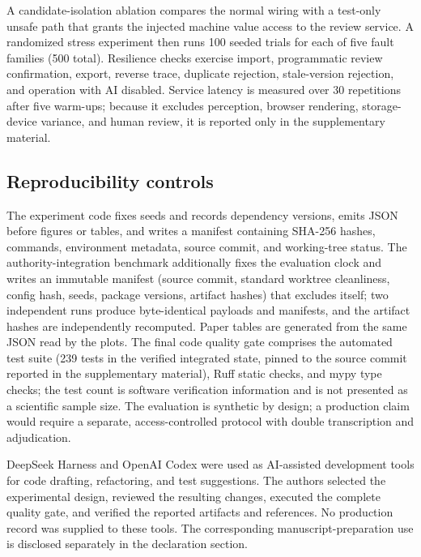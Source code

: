 A candidate-isolation ablation compares the normal wiring with a test-only unsafe path that grants the injected machine value access to the review service. A randomized stress experiment then runs 100 seeded trials for each of five fault families (500 total). Resilience checks exercise import, programmatic review confirmation, export, reverse trace, duplicate rejection, stale-version rejection, and operation with AI disabled. Service latency is measured over 30 repetitions after five warm-ups; because it excludes perception, browser rendering, storage-device variance, and human review, it is reported only in the supplementary material.

\subsection{Reproducibility controls}
The experiment code fixes seeds and records dependency versions, emits JSON before figures or tables, and writes a manifest containing SHA-256 hashes, commands, environment metadata, source commit, and working-tree status. The authority-integration benchmark additionally fixes the evaluation clock and writes an immutable manifest (source commit, standard worktree cleanliness, config hash, seeds, package versions, artifact hashes) that excludes itself; two independent runs produce byte-identical payloads and manifests, and the artifact hashes are independently recomputed. Paper tables are generated from the same JSON read by the plots. The final code quality gate comprises the automated test suite (239 tests in the verified integrated state, pinned to the source commit reported in the supplementary material), Ruff static checks, and mypy type checks; the test count is software verification information and is not presented as a scientific sample size. The evaluation is synthetic by design; a production claim would require a separate, access-controlled protocol with double transcription and adjudication.

DeepSeek Harness and OpenAI Codex were used as AI-assisted development tools for code drafting, refactoring, and test suggestions. The authors selected the experimental design, reviewed the resulting changes, executed the complete quality gate, and verified the reported artifacts and references. No production record was supplied to these tools. The corresponding manuscript-preparation use is disclosed separately in the declaration section.
